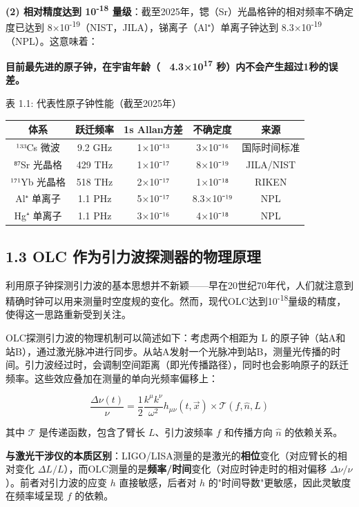 \documentclass[12pt,a4paper]{article}
\begin{document}
\textbf{(2) 相对精度达到 10\textsuperscript{-18} 量级}：截至2025年，锶（Sr）光晶格钟的相对频率不确定度已达到 8×10\textsuperscript{-19}（NIST，JILA），锑离子（Al⁺）单离子钟达到 8.3×10\textsuperscript{-19}（NPL）\cite{ref6}。这意味着：

\textbf{目前最先进的原子钟，在宇宙年龄（~ 4.3×10\textsuperscript{17} 秒）内不会产生超过1秒的误差。}

表 1.1: 代表性原子钟性能（截至2025年）

\begin{tabular}{|c|c|c|c|c|}
\hline
体系 & 跃迁频率 & 1s Allan方差 & 不确定度 & 来源 \\
\hline
¹³³Cs 微波 & 9.2 GHz & 1×10⁻¹³ & 3×10⁻¹⁶ & 国际时间标准 \\
⁸⁷Sr 光晶格 & 429 THz & 1×10⁻¹⁷ & 8×10⁻¹⁹ & JILA/NIST \\
¹⁷¹Yb 光晶格 & 518 THz & 2×10⁻¹⁷ & 1×10⁻¹⁸ & RIKEN \\
Al⁺ 单离子 & 1.1 PHz & 5×10⁻¹⁷ & 8.3×10⁻¹⁹ & NPL \\
Hg⁺ 单离子 & 1.1 PHz & 3×10⁻¹⁶ & 4×10⁻¹⁸ & NPL \\
\hline
\end{tabular}


\subsection{1.3 OLC 作为引力波探测器的物理原理}


利用原子钟探测引力波的基本思想并不新颖——早在20世纪70年代，人们就注意到精确时钟可以用来测量时空度规的变化。然而，现代OLC达到10\textsuperscript{-18}量级的精度，使得这一思路重新受到关注。

OLC探测引力波的物理机制可以简述如下：考虑两个相距为 L 的原子钟（站A和站B），通过激光脉冲进行同步。从站A发射一个光脉冲到站B，测量光传播的时间。引力波经过时，会调制空间距离（即光传播路径），同时也会影响原子的跃迁频率。这些效应叠加在测量的单向光频率偏移上：

$$\frac{\Delta\nu(t)}{\nu} = \frac{1}{2}\frac{k^\mu k^\nu}{\omega^2} h_{\mu\nu}(t, \vec{x}) \times \mathcal{T}(f, \hat{n}, L)$$

其中 $\mathcal{T}$ 是传递函数，包含了臂长 $L$、引力波频率 $f$ 和传播方向 $\hat{n}$ 的依赖关系。

\textbf{与激光干涉仪的本质区别}：LIGO/LISA测量的是激光的\textbf{相位}变化（对应臂长的相对变化 $\Delta L/L$），而OLC测量的是\textbf{频率/时间}变化（对应时钟走时的相对偏移 $\Delta\nu/\nu$）。前者对引力波的应变 $h$ 直接敏感，后者对 $h$ 的"时间导数"更敏感，因此灵敏度在频率域呈现 $f$ 的依赖。
\end{document}
